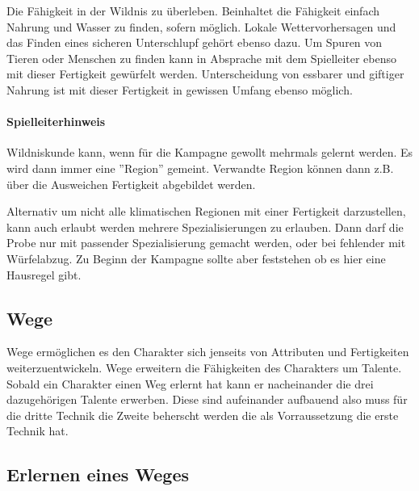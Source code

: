 \documentclass{article}
\begin{document}
Die Fähigkeit in der Wildnis zu überleben. Beinhaltet die Fähigkeit einfach Nahrung und Wasser zu finden, sofern
möglich. Lokale Wettervorhersagen und das Finden eines sicheren Unterschlupf gehört ebenso dazu. Um Spuren von
Tieren oder Menschen zu finden kann in Absprache mit dem Spielleiter ebenso mit dieser Fertigkeit gewürfelt werden.
Unterscheidung von essbarer und giftiger Nahrung ist mit dieser Fertigkeit in gewissen Umfang ebenso möglich.

\begin{mdframed}[hidealllines=true, backgroundcolor=black!10]
\paragraph{Spielleiterhinweis}

Wildniskunde kann, wenn für die Kampagne gewollt mehrmals gelernt werden. Es wird dann immer eine ''Region'' gemeint.
Verwandte Region können dann z.B. über die Ausweichen Fertigkeit abgebildet werden.

Alternativ um nicht alle klimatischen Regionen mit einer Fertigkeit darzustellen, kann auch erlaubt werden mehrere
Spezialisierungen zu erlauben. Dann darf die Probe nur mit passender Spezialisierung gemacht werden, oder bei
fehlender mit Würfelabzug. Zu Beginn der Kampagne sollte aber feststehen ob es hier eine Hausregel gibt.

\end{mdframed}
\begin{center}
\section{Wege}
\end{center}

Wege ermöglichen es den Charakter sich jenseits von Attributen und Fertigkeiten weiterzuentwickeln. Wege erweitern
die Fähigkeiten des Charakters um Talente.
Sobald ein Charakter einen Weg erlernt hat kann er nacheinander die drei dazugehörigen Talente erwerben. Diese
sind aufeinander aufbauend also muss für die dritte Technik die Zweite beherscht werden die als Vorraussetzung die
erste Technik hat.

\begin{center}
\subsection{Erlernen eines Weges}
\end{center}
\end{document}
